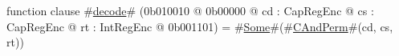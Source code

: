 function clause #\hyperref[zdecode]{decode}# (0b010010 @ 0b00000 @ cd : CapRegEnc @ cs : CapRegEnc @ rt : IntRegEnc @ 0b001101) = #\hyperref[zSome]{Some}#(#\hyperref[zCAndPerm]{CAndPerm}#(cd, cs, rt))
